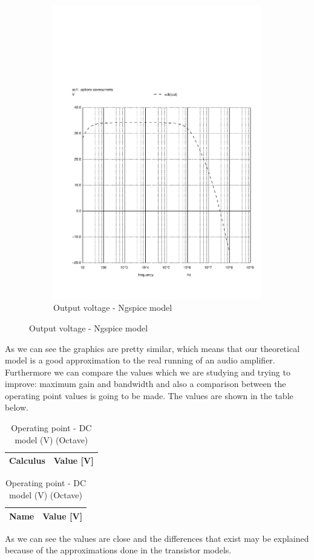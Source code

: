 \begin{figure}[H]
\begin{subfigure}{.5\textwidth}
  \includegraphics[width=1.1\linewidth]{vo2f.pdf}
  \caption{Output voltage - Ngspice model}
  \label{fig:sim5}
\end{subfigure}
\end{figure}

\par As we can see the graphics are pretty similar, which means that our theoretical model is a good approximation to the real running of an audio amplifier. Furthermore we can compare the values which we are studying and trying to improve: maximum gain and bandwidth and also a comparison between the operating point values is going to be made. The values are shown in the table below.

\begin{table}[H]
\parbox{.45\linewidth}{
  \centering
  \begin{tabular}{|l|r|}
    \hline    
    {\bf Calculus} & {\bf Value [V]} \\ \hline
    
  \end{tabular}
  \caption{Operating point - DC model (V) (Ngspice)}} 
\parbox{.45\linewidth}{
 \centering
  \begin{tabular}{|l|r|}
    \hline    
    {\bf Name} & {\bf Value [V]} \\ \hline
    
  \end{tabular}
  \caption{Operating point - DC model (V) (Octave)}}
\end{table}

\par As we can see the values are close and the differences that exist may be explained because of the approximations done in the transistor models.
\newpage

